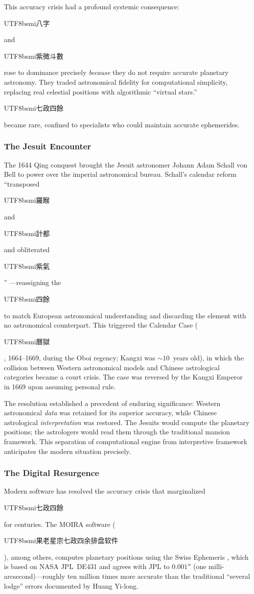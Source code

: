 \documentclass[10pt,a4paper]{article}
\newcommand{\zh}[1]{\begin{CJK}{UTF8}{bsmi}#1\end{CJK}}
\begin{document}
This accuracy crisis had a profound systemic consequence: \zh{八字} and
\zh{紫微斗數} rose to dominance precisely \emph{because} they do not
require accurate planetary astronomy. They traded astronomical fidelity
for computational simplicity, replacing real celestial positions with
algorithmic ``virtual stars.'' \zh{七政四餘} became rare, confined to
specialists who could maintain accurate ephemerides.

\subsubsection{The Jesuit Encounter}

The 1644 Qing conquest brought the Jesuit astronomer Johann Adam Schall
von Bell to power over the imperial astronomical bureau. Schall's calendar
reform ``transposed \zh{羅睺} and \zh{計都} and obliterated
\zh{紫氣}'' \cite{lu_schall_2020}---reassigning the \zh{四餘} to match
European astronomical understanding and discarding the element with no
astronomical counterpart. This triggered the Calendar Case
(\zh{曆獄}, 1664--1669, during the Oboi regency; Kangxi was
${\sim}10$~years old), in which the collision between Western astronomical
models and Chinese astrological categories became a court crisis.
The case was reversed by the Kangxi Emperor in 1669 upon assuming
personal rule.

The resolution established a precedent of enduring significance: Western
astronomical \emph{data} was retained for its superior accuracy, while
Chinese astrological \emph{interpretation} was restored. The Jesuits
would compute the planetary positions; the astrologers would read them
through the traditional mansion framework. This separation of
computational engine from interpretive framework anticipates the modern
situation precisely.

\subsubsection{The Digital Resurgence}

Modern software has resolved the accuracy crisis that marginalized
\zh{七政四餘} for centuries. The MOIRA software
(\zh{果老星宗七政四余排盘软件}), among others, computes planetary
positions using the Swiss Ephemeris \cite{swiss_ephemeris}, which is based
on NASA JPL~DE431 and agrees with JPL to $0.001''$ (one
milli-arcsecond)---roughly ten million times more accurate than the
traditional ``several lodge'' errors documented by Huang Yi-long.
\end{document}
